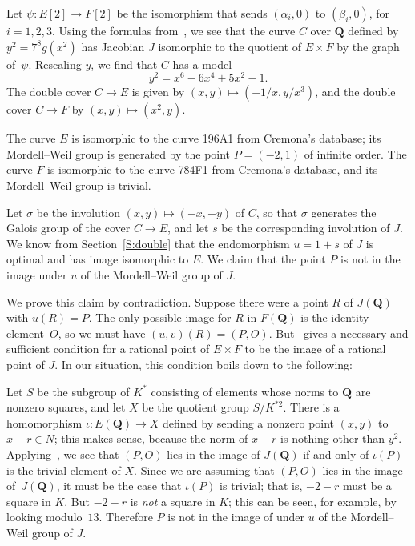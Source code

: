 \documentclass{amsart}
\theoremstyle{remark}
\begin{document}
Let $\psi\colon E[2]\to F[2]$ be the isomorphism that sends $(\alpha_i,0)$ to 
$(\beta_i,0)$, for $i=1,2,3$. Using the formulas 
from~\cite[Proposition~4, p.~324]{HoweLeprevostEtAl2000}, we see that the
curve $C$ over ${{\mathbf{Q}}}$ defined by $y^2 = 7^8 g(x^2)$ has Jacobian $J$ isomorphic 
to the quotient of $E\times F$ by the graph of~$\psi$. Rescaling $y$, we find
that $C$ has a model 
\[
y^2 = x^6 - 6 x^4 + 5 x^2 - 1.
\]
The double cover $C\to E$ is given by $(x,y)\mapsto (-1/x, y/x^3)$, and the
double cover $C\to F$ by $(x,y) \mapsto (x^2,y)$.

The curve $E$ is isomorphic to the curve 196A1 from Cremona's database; its 
Mordell--Weil group is generated by the point $P = (-2,1)$ of infinite order.
The curve $F$ is isomorphic to the curve 784F1 from Cremona's database, and its
Mordell--Weil group is trivial.

Let $\sigma$ be the involution $(x,y)\mapsto(-x,-y)$ of $C$, so that $\sigma$ 
generates the Galois group of the cover $C\to E$, and let $s$ be the 
corresponding involution of $J$.  We know from Section~\ref{S:double} that the
endomorphism $u = 1 + s$ of $J$ is optimal and has image isomorphic to $E$. We
claim that the point $P$ is not in the image under $u$ of the Mordell--Weil 
group of $J$.

We prove this claim by contradiction.  Suppose there were a point $R$ of 
$J({{\mathbf{Q}}})$ with $u(R) = P$. The only possible image for $R$ in $F({{\mathbf{Q}}})$ is the 
identity element~$O$, so we must have $(u,v)(R) = (P,O)$. 
But~\cite[Proposition~12, p.~338]{HoweLeprevostEtAl2000} gives a necessary and 
sufficient condition for a rational point of $E\times F$ to be the image of a
rational point of $J$. In our situation, this condition boils down to the 
following:

Let $S$ be the subgroup of $K^*$ consisting of elements whose norms to ${{\mathbf{Q}}}$
are nonzero squares, and let $X$ be the quotient group $S/K^{*2}$.  There is a
homomorphism $\iota\colon E({{\mathbf{Q}}})\to X$ defined by sending a nonzero point 
$(x,y)$ to $x - r\in N$; this makes sense, because the norm of $x-r$ is nothing
other than $y^2$. 
Applying~\cite[Proposition~12, p.~338]{HoweLeprevostEtAl2000}, we see that 
$(P,O)$ lies in the image of $J({{\mathbf{Q}}})$ if and only of $\iota(P)$ is the trivial
element of $X$. Since we are assuming that $(P,O)$ lies in the image 
of~$J({{\mathbf{Q}}})$, it must be the case that $\iota(P)$ is trivial; that is, $-2-r$
must be a square in $K$.  But $-2-r$ is \emph{not} a square in $K$; this can be
seen, for example, by looking modulo~$13$. Therefore $P$ is not in the image of
under $u$ of the Mordell--Weil group of $J$.
\end{document}
